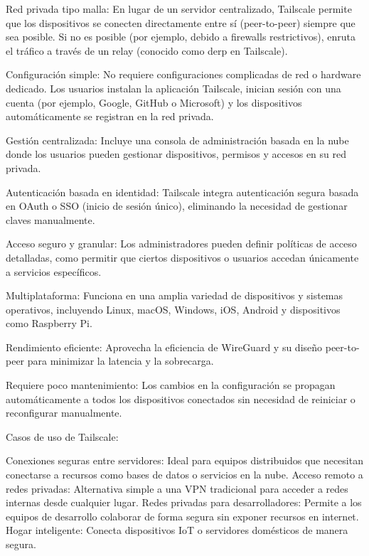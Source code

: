 \begin{enumerate}
\begin{enumerate}
    Red privada tipo malla:
        En lugar de un servidor centralizado, Tailscale permite que los dispositivos se conecten directamente entre sí (peer-to-peer) siempre que sea posible. Si no es posible (por ejemplo, debido a firewalls restrictivos), enruta el tráfico a través de un relay (conocido como derp en Tailscale).

    Configuración simple:
        No requiere configuraciones complicadas de red o hardware dedicado.
        Los usuarios instalan la aplicación Tailscale, inician sesión con una cuenta (por ejemplo, Google, GitHub o Microsoft) y los dispositivos automáticamente se registran en la red privada.

    Gestión centralizada:
        Incluye una consola de administración basada en la nube donde los usuarios pueden gestionar dispositivos, permisos y accesos en su red privada.

    Autenticación basada en identidad:
        Tailscale integra autenticación segura basada en OAuth o SSO (inicio de sesión único), eliminando la necesidad de gestionar claves manualmente.

    Acceso seguro y granular:
        Los administradores pueden definir políticas de acceso detalladas, como permitir que ciertos dispositivos o usuarios accedan únicamente a servicios específicos.

    Multiplataforma:
        Funciona en una amplia variedad de dispositivos y sistemas operativos, incluyendo Linux, macOS, Windows, iOS, Android y dispositivos como Raspberry Pi.

    Rendimiento eficiente:
        Aprovecha la eficiencia de WireGuard y su diseño peer-to-peer para minimizar la latencia y la sobrecarga.

    Requiere poco mantenimiento:
        Los cambios en la configuración se propagan automáticamente a todos los dispositivos conectados sin necesidad de reiniciar o reconfigurar manualmente.

Casos de uso de Tailscale:

    Conexiones seguras entre servidores: Ideal para equipos distribuidos que necesitan conectarse a recursos como bases de datos o servicios en la nube.
    Acceso remoto a redes privadas: Alternativa simple a una VPN tradicional para acceder a redes internas desde cualquier lugar.
    Redes privadas para desarrolladores: Permite a los equipos de desarrollo colaborar de forma segura sin exponer recursos en internet.
    Hogar inteligente: Conecta dispositivos IoT o servidores domésticos de manera segura.



\end{enumerate}
\end{enumerate}
